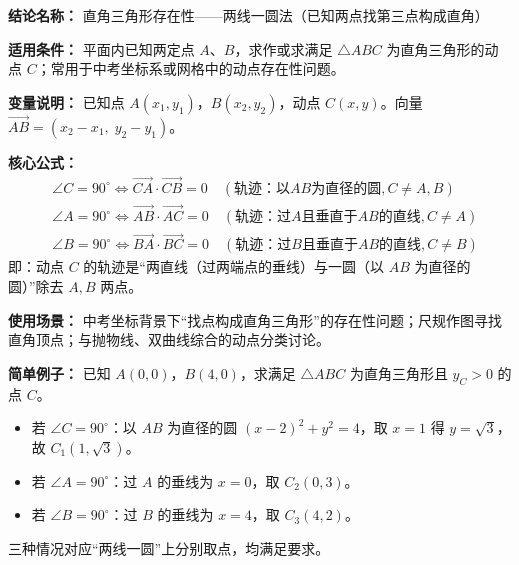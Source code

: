 \textbf{结论名称：} 直角三角形存在性——两线一圆法（已知两点找第三点构成直角）

\textbf{适用条件：} 平面内已知两定点 \(A\)、\(B\)，求作或求满足 \(\triangle ABC\) 为直角三角形的动点 \(C\)；常用于中考坐标系或网格中的动点存在性问题。

\textbf{变量说明：} 已知点 \(A(x_1,y_1)\)，\(B(x_2,y_2)\)，动点 \(C(x,y)\)。向量 \(\overrightarrow{AB}=(x_2-x_1,\;y_2-y_1)\)。

\textbf{核心公式：}
\[
\boxed{
\begin{aligned}
&\angle C=90^\circ \Leftrightarrow \overrightarrow{CA}\cdot\overrightarrow{CB}=0 \quad (\text{轨迹：以}AB\text{为直径的圆},C\neq A,B)\\
&\angle A=90^\circ \Leftrightarrow \overrightarrow{AB}\cdot\overrightarrow{AC}=0 \quad (\text{轨迹：过}A\text{且垂直于}AB\text{的直线},C\neq A)\\
&\angle B=90^\circ \Leftrightarrow \overrightarrow{BA}\cdot\overrightarrow{BC}=0 \quad (\text{轨迹：过}B\text{且垂直于}AB\text{的直线},C\neq B)
\end{aligned}
}
\]
即：动点 \(C\) 的轨迹是“两直线（过两端点的垂线）与一圆（以 \(AB\) 为直径的圆）”除去 \(A,B\) 两点。

\textbf{使用场景：} 中考坐标背景下“找点构成直角三角形”的存在性问题；尺规作图寻找直角顶点；与抛物线、双曲线综合的动点分类讨论。

\textbf{简单例子：} 已知 \(A(0,0)\)，\(B(4,0)\)，求满足 \(\triangle ABC\) 为直角三角形且 \(y_C>0\) 的点 \(C\)。
\begin{itemize}
\item 若 \(\angle C=90^\circ\)：以 \(AB\) 为直径的圆 \((x-2)^2+y^2=4\)，取 \(x=1\) 得 \(y=\sqrt{3}\)，故 \(C_1(1,\sqrt{3})\)。
\item 若 \(\angle A=90^\circ\)：过 \(A\) 的垂线为 \(x=0\)，取 \(C_2(0,3)\)。
\item 若 \(\angle B=90^\circ\)：过 \(B\) 的垂线为 \(x=4\)，取 \(C_3(4,2)\)。
\end{itemize}
三种情况对应“两线一圆”上分别取点，均满足要求。